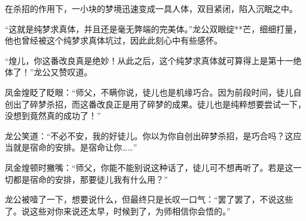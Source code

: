 \begin{this_body}
在杀招的作用下，一小块的梦境迅速变成一具人体，双目紧闭，陷入沉眠之中。

“这就是纯梦求真体，并且还是毫无弊端的完美体。”龙公双眼绽**芒，细细打量，他也曾经被这个纯梦求真体坑过，因此此刻心中有些感怀。

“煌儿，你这番改良真是绝妙！从此之后，这个纯梦求真体就可算得上是第十一绝体了！”龙公又赞叹道。

凤金煌眨了眨眼：“师父，不瞒你说，徒儿也是机缘巧合。因为前段时间，徒儿自创出了碎梦杀招，而这番改良正是用了碎梦的成果。徒儿也是纯粹想要尝试一下，没想到竟然真的成功了！”

龙公笑道：“不必不安，我的好徒儿。你以为你自创出碎梦杀招，是巧合吗？这应当就是宿命的安排。是宿命让你……”

凤金煌顿时撇嘴：“师父，你能不能别说这种话了，徒儿可不想再听了。若是这一切都是宿命的安排，那要徒儿我有什么用？”

龙公被噎了一下，想要说什么，但最终只是长叹一口气：“罢了罢了，不说这些了。说这些对你来说还太早，时候到了，为师相信你会悟的。”

\end{this_body}

